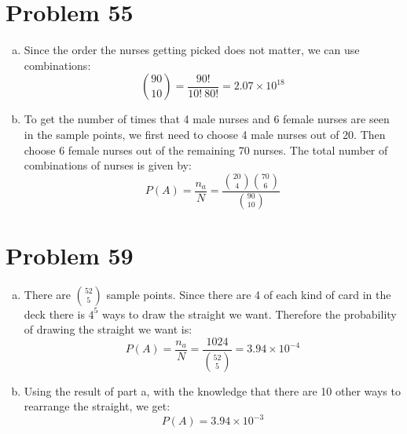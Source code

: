 \documentclass{article}
\begin{document}
\section*{Problem 55}
    \begin{enumerate}[a)]
        \item Since the order the nurses getting picked does not matter, we can use combinations: $${90 \choose 10} = \frac{90!}{10!\ 80!} = 2.07 \times 10^{18}$$
        \item To get the number of times that 4 male nurses and 6 female nurses are seen in the sample points, we first need to choose 4 male nurses out of 20. Then choose 6 female nurses out of the remaining 70 nurses. The total number of combinations of nurses is given by:
            $$P(A) = \frac{n_a}{N} = \frac{{20 \choose 4}{70 \choose 6}}{{90 \choose 10}} $$
    \end{enumerate}

\section*{Problem 59}
    \begin{enumerate}[a)]
        \item There are ${52 \choose 5}$ sample points. Since there are 4 of each kind of card in the deck there is $4^5$ ways to draw the straight we want. Therefore the probability of drawing the straight we want is:
        $$P(A) = \frac{n_a}{N} = \frac{1024}{{52 \choose 5}} = 3.94 \times 10^{-4}$$
        \item Using the result of part a, with the knowledge that there are 10 other ways to rearrange the straight, we get:
        $$P(A) = 3.94 \times 10^{-3}$$
    \end{enumerate}
    
\end{document}
